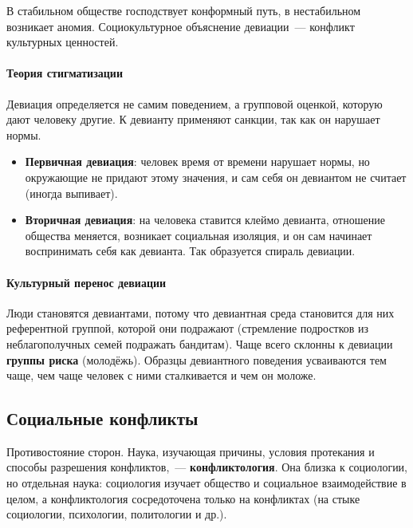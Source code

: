\documentclass[12pt]{article}
\begin{document}
	\begin{note}
		В стабильном обществе господствует конформный путь, в нестабильном возникает аномия. Социокультурное объяснение девиации~--- конфликт культурных ценностей.
	\end{note}

	\paragraph{Теория стигматизации}

	\begin{person}
		Девиация определяется не самим поведением, а групповой оценкой, которую дают человеку другие. К девианту применяют санкции, так как он нарушает нормы.
	\end{person}

	\begin{itemize}
		\item \textbf{Первичная девиация}: человек время от времени нарушает нормы, но окружающие не придают этому значения, и сам себя он девиантом не считает (иногда выпивает).
		\item \textbf{Вторичная девиация}: на человека ставится клеймо девианта, отношение общества меняется, возникает социальная изоляция, и он сам начинает воспринимать себя как девианта. Так образуется спираль девиации.
	\end{itemize}

	\paragraph{Культурный перенос девиации}

	\begin{person}
		Люди становятся девиантами, потому что девиантная среда становится для них референтной группой, которой они подражают (стремление подростков из неблагополучных семей подражать бандитам). Чаще всего склонны к девиации \textbf{группы риска} (молодёжь). Образцы девиантного поведения усваиваются тем чаще, чем чаще человек с ними сталкивается и чем он моложе.
	\end{person}

	\subsection{Социальные конфликты}

	\begin{definition}[Конфликт]
		Противостояние сторон. Наука, изучающая причины, условия протекания и способы разрешения конфликтов,~--- \textbf{конфликтология}. Она близка к социологии, но отдельная наука: социология изучает общество и социальное взаимодействие в целом, а конфликтология сосредоточена только на конфликтах (на стыке социологии, психологии, политологии и др.).
	\end{definition}
\end{document}
